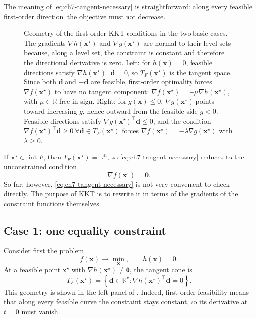 The meaning of \eqref{eq:ch7-tangent-necessary} is straightforward: along
every feasible first-order direction, the objective must not decrease.

\begin{figure}[ht]
    \centering
    \caption[Geometry of equality and inequality KKT conditions]{Geometry of the
    first-order KKT conditions in the two basic cases. The gradients
    $\nabla h(\mathbf{x}^\star)$ and $\nabla g(\mathbf{x}^\star)$ are normal to
    their level sets because, along a level set, the constraint is constant and 
    therefore the directional derivative is
    zero. Left: for $h(\mathbf{x})=0$, feasible directions satisfy
    $\nabla h(\mathbf{x}^\star)^\top\mathbf{d}=0$, so
    $T_F(\mathbf{x}^\star)$ is the tangent space. Since both $\mathbf{d}$ and
    $-\mathbf{d}$ are feasible, first-order optimality forces
    $\nabla f(\mathbf{x}^\star)$ to have no tangent component:
    $\nabla f(\mathbf{x}^\star)=-\mu\nabla h(\mathbf{x}^\star)$, with
    $\mu\in\mathbb{R}$ free in sign. Right: for $g(\mathbf{x})\le0$,
    $\nabla g(\mathbf{x}^\star)$ points toward increasing $g$, hence outward
    from the feasible side $g<0$. Feasible directions satisfy
    $\nabla g(\mathbf{x}^\star)^\top\mathbf{d}\le0$, and the condition
    $\nabla f(\mathbf{x}^\star)^\top\mathbf{d}\ge0 \ \forall
    \mathbf{d}\in T_F(\mathbf{x}^\star)$ forces
    $\nabla f(\mathbf{x}^\star)=-\lambda\nabla g(\mathbf{x}^\star)$ with
    $\lambda\ge0$.}
    \label{fig:ch7-kkt-condition}
\end{figure}

If $\mathbf{x}^\star\in \operatorname{int} F$, then
$T_F(\mathbf{x}^\star)=\mathbb{R}^n$, so \eqref{eq:ch7-tangent-necessary} reduces
to the unconstrained condition
\[
  \nabla f(\mathbf{x}^\star)=\mathbf{0}.
\]
So far, however, \eqref{eq:ch7-tangent-necessary} is not very convenient to
check directly. The purpose of KKT is to rewrite it in terms of the gradients
of the constraint functions themselves.

\subsection{Case 1: one equality constraint}
\label{subsec:ch7-one-equality}
Consider first the problem
\[
  f(\mathbf{x}) \to \min_{\mathbf{x}},
  \qquad
  h(\mathbf{x})=0.
\]
At a feasible point $\mathbf{x}^\star$ with $\nabla h(\mathbf{x}^\star)\neq \mathbf{0}$,
the tangent cone is
\begin{equation}
  \label{eq:ch7-tangent-equality}
  T_F(\mathbf{x}^\star)
  = \left\{
    \mathbf{d}\in\mathbb{R}^n:
    \nabla h(\mathbf{x}^\star)^\top \mathbf{d}=0
  \right\}.
\end{equation}
This geometry is shown in the left panel of .
Indeed, first-order feasibility means that along every feasible curve the
constraint stays constant, so its derivative at $t=0$ must vanish.

